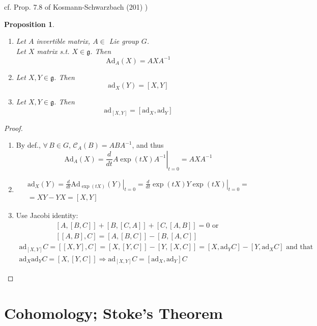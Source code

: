\documentclass[10pt]{amsart}
\newtheorem{proposition}{Proposition}
\begin{document}
\begin{multicols*}{2}
cf. Prop. 7.8 of Kosmann-Schwarzbach (201) \cite{YKosmann-Schwarzbach2010})
\begin{proposition}
	\begin{enumerate}
		\item Let $A$ invertible matrix, $A \in $ Lie group $G$.  \\
		Let $X$ matrix s.t. $X \in \mathfrak{g}$.  Then
		\[
		\text{Ad}_A(X) = AXA^{-1}
		\]
		\item Let $X,Y \in \mathfrak{g}$.  Then 
		\[
		\text{ad}_X(Y) = [X,Y]
		\]
		\item Let $X,Y \in \mathfrak{g}$.  Then 
		\[
		\text{ad}_{[X,Y]} = [ \text{ad}_X, \text{ad}_Y ]
		\]
	\end{enumerate}
\end{proposition}
\begin{proof}
	\begin{enumerate}
		\item By def., $\forall \, B \in G$, $\mathcal{C}_A(B) = ABA^{-1}$, and thus
		\[
		\text{Ad}_A(X) = \left. \frac{d}{dt} A\exp{ (tX)  }A^{-1} \right|_{t=0} = AXA^{-1}
		\]
		\item \[
		\begin{gathered}
		\text{ad}_X(Y) = \left. \frac{d}{dt} \text{Ad}_{\exp{(tX)}}(Y) \right|_{t=0} = \left. \frac{d}{dt} \exp{(tX)} Y \exp{(tX)} \right|_{t=0} = \\
		= XY - YX = [X,Y] 
		\end{gathered}
		\]
		\item Use Jacobi identity: 
		\[
		\begin{gathered}
		[A,[B,C]] +  [B,[C,A]] +  [C,[A,B]] = 0 \text{ or } \\ 
		[[A,B],C] = [A,[B,C]] - [B,[A,C]]
		\end{gathered}
		\] 
		\[
		\begin{gathered}
		\text{ad}_{[X,Y]}C = [[X,Y],C] = [X,[Y,C]] - [Y,[X,C]] = [X,\text{ad}_YC] - [Y,\text{ad}_XC] \text{ and that } \\ 
		\text{ad}_X\text{ad}_Y C = [X,[Y,C]] \Longrightarrow \text{ad}_{[X,Y]}C = [\text{ad}_X,\text{ad}_Y ] C
		\end{gathered}
		\]
	\end{enumerate}
\end{proof}


\part{Cohomology; Stoke's Theorem}


\end{multicols*}
\end{document}
